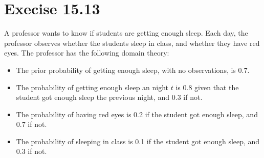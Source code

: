 \documentclass{article}
\begin{document}
\section{Execise 15.13}
A professor wants to know if students are getting enough sleep. Each
day, the professor observes whether the students sleep in class, and
whether they have red eyes. The professor has the following domain
theory:
\begin{itemize}
\item The prior probability of getting enough sleep, with no
  observations, is 0.7.
\item The probability of getting enough sleep an night $t$ is 0.8 given
  that the student got enough sleep the previous night, and 0.3 if not. 
\item The probability of having red eyes is 0.2 if the student got
  enough sleep, and 0.7 if not. 
\item The probability of sleeping in class is 0.1 if the student got
  enough sleep, and 0.3 if not. 
\end{itemize}
\end{document}
